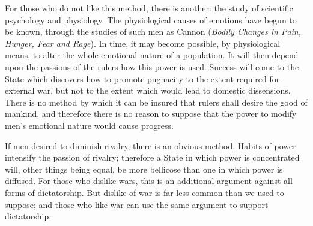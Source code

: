 For those who do not like this method, there is another: the study of scientific psychology and physiology. The physiological causes of emotions have begun to be known, through the studies of such men as Cannon (\emph{Bodily Changes in Pain, Hunger, Fear and Rage}). In time, it may become possible, by physiological means, to alter the whole emotional nature of a population. It will then depend upon the passions of the rulers how this power is used. Success will come to the State which discovers how to promote pugnacity to the extent required for external war, but not to the extent which would lead to domestic dissensions. There is no method by which it can be insured that rulers shall desire the good of mankind, and therefore there is no reason to suppose that the power to modify men's emotional nature would cause progress.

If men desired to diminish rivalry, there is an obvious method. Habits of power intensify the passion of rivalry; therefore a State in which power is concentrated will, other things being equal, be more bellicose than one in which power is diffused. For those who dislike wars, this is an additional argument against all forms of dictatorship. But dislike of war is far less common than we used to suppose; and those who like war can use the same argument to support dictatorship.